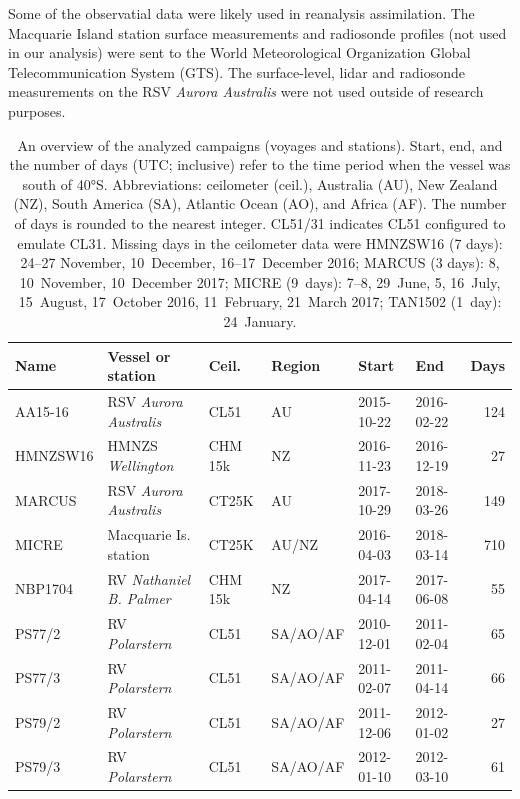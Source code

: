 \documentclass[draft]{agujournal2019}
\begin{document}
Some of the observatial data were likely used in reanalysis assimilation. The Macquarie Island station surface measurements and radiosonde profiles (not used in our analysis) were sent to the World Meteorological Organization Global Telecommunication System (GTS). The surface-level, lidar and radiosonde measurements on the RSV \textit{Aurora Australis} were not used outside of research purposes.

\begin{table}[p!]
\caption{
An overview of the analyzed campaigns (voyages and stations). Start, end, and the number of days (UTC; inclusive) refer to the time period when the vessel was south of 40°S. Abbreviations: ceilometer (ceil.), Australia (AU), New Zealand (NZ), South America (SA), Atlantic Ocean (AO), and Africa (AF). The number of days is rounded to the nearest integer. CL51/31 indicates CL51 configured to emulate CL31. Missing days in the ceilometer data were HMNZSW16 (7 days): 24--27 November, 10~December, 16--17~December 2016; MARCUS (3 days): 8, 10~November, 10~December 2017; MICRE (9~days): 7--8, 29~June, 5, 16~July, 15~August, 17~October 2016, 11~February, 21~March 2017; TAN1502 (1~day): 24~January.
}
\label{tab:voyages}
\centering
\small
\begin{tabular}{llllllr}
\textbf{Name} & \textbf{Vessel or station} & \textbf{Ceil.} & \textbf{Region} & \textbf{Start} & \textbf{End} & \textbf{Days}\\
\hline
AA15-16  & RSV \emph{Aurora Australis}   & CL51    & AU       & 2015-10-22 & 2016-02-22 & 124 \\
HMNZSW16 & HMNZS \emph{Wellington}       & CHM 15k & NZ       & 2016-11-23 & 2016-12-19 & 27 \\
MARCUS   & RSV \emph{Aurora Australis}   & CT25K   & AU       & 2017-10-29 & 2018-03-26 & 149 \\
MICRE    & Macquarie Is. station         & CT25K   & AU/NZ    & 2016-04-03 & 2018-03-14 & 710 \\
NBP1704  & RV \emph{Nathaniel B. Palmer} & CHM 15k & NZ       & 2017-04-14 & 2017-06-08 & 55 \\
PS77/2   & RV \emph{Polarstern}          & CL51    & SA/AO/AF & 2010-12-01 & 2011-02-04 & 65 \\
PS77/3   & RV \emph{Polarstern}          & CL51    & SA/AO/AF & 2011-02-07 & 2011-04-14 & 66 \\
PS79/2   & RV \emph{Polarstern}          & CL51    & SA/AO/AF & 2011-12-06 & 2012-01-02 & 27 \\
PS79/3   & RV \emph{Polarstern}          & CL51    & SA/AO/AF & 2012-01-10 & 2012-03-10 & 61 \\

\end{tabular}
\end{table}
\end{document}
